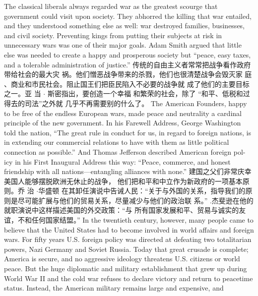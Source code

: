 \begin{paracol}{2}
The classical liberals always regarded war as the greatest
scourge that government could visit upon society. They abhorred the killing that war entailed, and they understood something else as well: war destroyed families, businesses, and civil
society. Preventing kings from putting their subjects at risk in
unnecessary wars was one of their major goals. Adam Smith
argued that little else was needed to create a happy and prosperous society but ``peace, easy taxes, and a tolerable administration of justice.''
\switchcolumn
传统的自由主义者常常把战争看作政府带给社会的最大灾
祸。他们憎恶战争带来的杀戮，他们也很清楚战争会毁灭家
庭 、商业和市民社会。阻止国王们把臣民陷入不必要的战争就
成了他们的主要目标之一。亚 当 $\cdot$ 斯密指出，要创造一个幸福
和繁荣的社会，除了 “和平、低税和过得去的司法”之外就
几乎不再需要别的什么了。
\switchcolumn*
The American Founders, happy to be free of the endless European wars, made peace and neutrality a cardinal principle of
the new government. In his Farewell Address, George Washington told the nation, ``The great rule in conduct for us, in regard to foreign nations, is in extending our commercial
relations to have with them as little political connection as possible.'' And Thomas Jefferson described American foreign pol-
icy in his First Inaugural Address this way: ``Peace, commerce,
and honest friendship with all nations---entangling alliances
with none.''
\switchcolumn
建国之父们非常庆幸美国人能够摆脱欧洲无休止的战争，
他们把和平和中立作为新政府的一项基本原则。乔 治 $\cdot$华盛顿
在其卸任演说中告诫人民：“关于与外国的关系，指导我们的原
则是尽可能扩展与他们的贸易关系，尽量减少与他们的政治联
系。” .杰斐逊在他的就职演说中这样描述美国的外交政策：“与
所有国家发展和平、贸易与诚实的友谊，不和任何国家结盟。”
\switchcolumn*
In the twentieth century, however, many people came to believe that the United States had to become involved in world
affairs and foreign wars. For fifty years U.S. foreign policy was
directed at defeating two totalitarian powers, Nazi Germany
and Soviet Russia. Today that great crusade is complete; America is secure, and no aggressive ideology threatens U.S. citizens
or world peace. But the huge diplomatic and military establishment that grew up during World War II and the cold war
refuses to declare victory and return to peacetime status. Instead, the American military remains large and expensive, and

\end{paracol}
